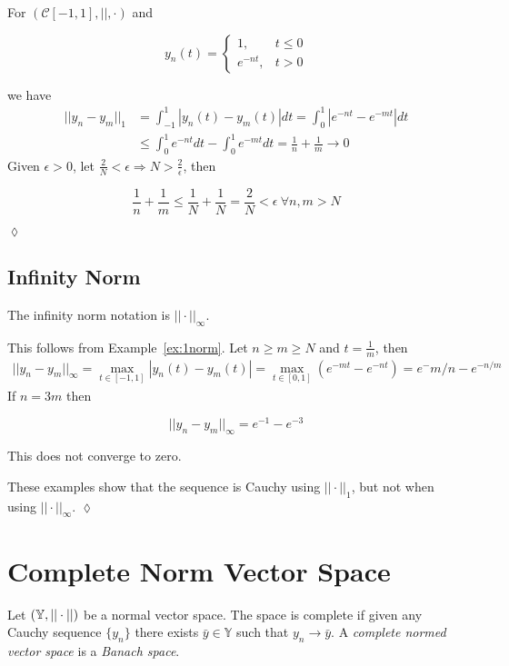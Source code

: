 \begin{example}%
\label{ex:1norm}
For $(\mathcal{C}[-1,1],||,\cdot)$ and

\begin{equation*}
y_n(t) = \begin{cases} 1, & t\leq 0 \\ e^{-nt}, & t>0 \end{cases}
\end{equation*}

we have
\begin{align*}
||y_n-y_m||_1 &= \int_{-1}^1|y_n(t)-y_m(t)|dt = \int_0^1|e^{-nt}-e^{-mt}|dt \\
&\leq \int_0^1e^{-nt}dt - \int_0^1e^{-mt}dt = \frac{1}{n} + \frac{1}{m} \to 0
\end{align*}
Given $\epsilon>0$, let $\frac{2}{N}<\epsilon\Rightarrow N>\frac{2}{\epsilon}$, then

\begin{equation*}
\frac{1}{n} + \frac{1}{m}\leq \frac{1}{N}+\frac{1}{N} = \frac{2}{N}<\epsilon~\forall n,m>N
\end{equation*}

$\lozenge$
\end{example}

\subsection{Infinity Norm}
The infinity norm notation is $||\cdot||_\infty$.
\begin{example}
This follows from Example~\ref{ex:1norm}.
Let $n\geq m\geq N$ and $t=\frac{1}{m}$, then
\begin{align*}
||y_n-y_m||_\infty = \max_{t\in[-1,1]}|y_n(t)-y_m(t)| = \max_{t\in[0,1]}(e^{-mt}-e^{-nt}) = e^-{m/n}-e^{-n/m}
\end{align*}
If $n=3m$ then

\begin{equation*}
||y_n-y_m||_\infty = e^{-1}-e^{-3}
\end{equation*}

This does not converge to zero.

These examples show that the sequence is Cauchy using $||\cdot||_1$, but not when using $||\cdot||_\infty$.
$\lozenge$
\end{example}

\section{Complete Norm Vector Space}
\begin{definition}
Let $(\mathbb{Y},||\cdot||)$ be a normal vector space.
The space is complete if given any Cauchy sequence $\{y_n\}$ there exists $\bar{y}\in\mathbb{Y}$ such that $y_n\to\bar{y}$.
A \textit{complete normed vector space} is a \textit{Banach space}.
\end{definition}

